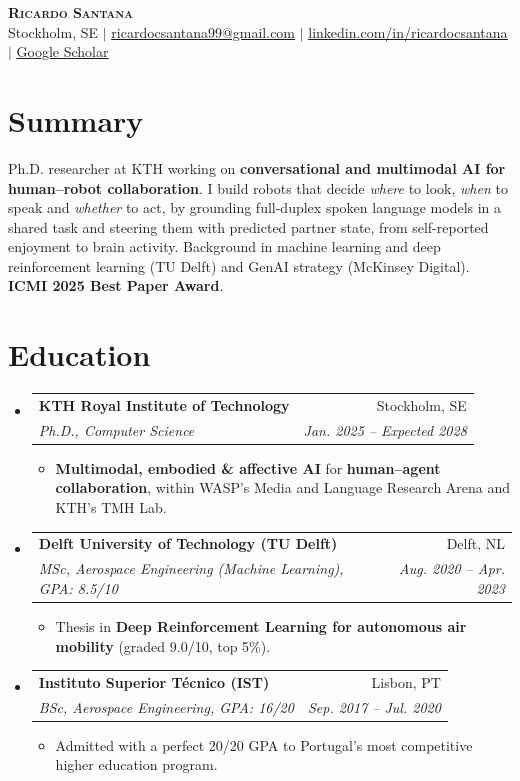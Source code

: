 \documentclass[letterpaper,11pt]{article}
\makeatletter
\newcommand{\resumeItem}[1]{
  \item\small{
    {#1 \vspace{-2pt}}
  }
}
\newcommand{\resumeSubheading}[4]{
  \vspace{-2pt}\item
    \begin{tabular*}{0.97\textwidth}[t]{l@{\extracolsep{\fill}}r}
      \textbf{#1} & #2 \\
      \textit{\small#3} & \textit{\small #4} \\
    \end{tabular*}\vspace{-7pt}
}
\newcommand{\resumeSubHeadingListStart}{\begin{itemize}[leftmargin=0.15in, label={}]}
\newcommand{\resumeSubHeadingListEnd}{\end{itemize}}
\newcommand{\resumeItemListStart}{\begin{itemize}}
\newcommand{\resumeItemListEnd}{\end{itemize}\vspace{-5pt}}
\makeatother
\begin{document}
\begin{center}
    \textbf{\Huge \scshape Ricardo Santana} \\ \vspace{5pt}
    \small Stockholm, SE $|$
    \href{mailto:ricardocsantana99@gmail.com}{\underline{ricardocsantana99@gmail.com}} $|$
    \href{https://linkedin.com/in/ricardocsantana}{\underline{linkedin.com/in/ricardocsantana}} $|$
    \href{https://scholar.google.com/citations?user=IqX633oAAAAJ&hl=en}{\underline{Google Scholar}}
\end{center}

\section{Summary}
\small{Ph.D. researcher at KTH working on \textbf{conversational and multimodal AI for human--robot collaboration}. I build robots that decide \emph{where} to look, \emph{when} to speak and \emph{whether} to act, by grounding full-duplex spoken language models in a shared task and steering them with predicted partner state, from self-reported enjoyment to brain activity. Background in machine learning and deep reinforcement learning (TU Delft) and GenAI strategy (McKinsey Digital). \textbf{ICMI 2025 Best Paper Award}.}

\section{Education}
  \resumeSubHeadingListStart
   \resumeSubheading
      {KTH Royal Institute of Technology}{Stockholm, SE}
      {Ph.D., Computer Science}{Jan. 2025 -- Expected 2028}
      \resumeItemListStart
        \resumeItem{\textbf{Multimodal, embodied \& affective AI} for \textbf{human--agent collaboration}, within WASP's Media and Language Research Arena and KTH's TMH Lab.}
      \resumeItemListEnd
    \resumeSubheading
      {Delft University of Technology (TU Delft)}{Delft, NL}
      {MSc, Aerospace Engineering (Machine Learning), GPA: 8.5/10}{Aug. 2020 -- Apr. 2023}
      \resumeItemListStart
        \resumeItem{Thesis in \textbf{Deep Reinforcement Learning for autonomous air mobility} (graded 9.0/10, top 5\%).}
      \resumeItemListEnd
    \resumeSubheading
      {Instituto Superior Técnico (IST)}{Lisbon, PT}
      {BSc, Aerospace Engineering, GPA: 16/20}{Sep. 2017 -- Jul. 2020}
      \resumeItemListStart
        \resumeItem{Admitted with a perfect 20/20 GPA to Portugal's most competitive higher education program.}
      \resumeItemListEnd
  \resumeSubHeadingListEnd
\end{document}
